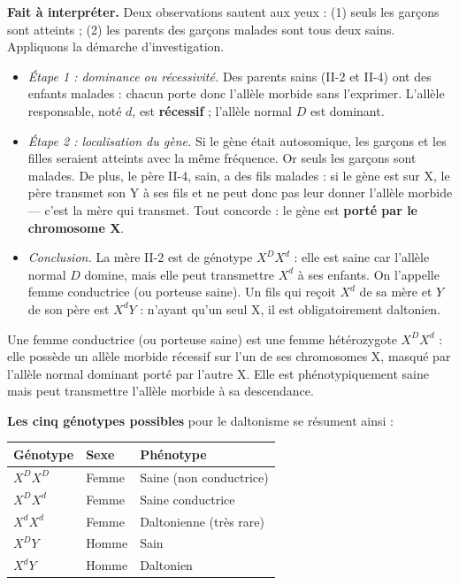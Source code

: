 \documentclass[11pt]{article}
\newcommand{\cle}[1]{{\popxbold\color{popdark}#1}}
\begin{document}
\textbf{Fait à interpréter.} Deux observations sautent aux yeux : (1) seuls les garçons sont atteints ; (2) les parents des garçons malades sont tous deux sains. Appliquons la démarche d'investigation.

\begin{itemize}
  \item \emph{Étape 1 : dominance ou récessivité.} Des parents sains (II-2 et II-4) ont des enfants malades : chacun porte donc l'allèle morbide sans l'exprimer. L'allèle responsable, noté $d$, est \textbf{récessif} ; l'allèle normal $D$ est dominant.
  \item \emph{Étape 2 : localisation du gène.} Si le gène était autosomique, les garçons et les filles seraient atteints avec la même fréquence. Or seuls les garçons sont malades. De plus, le père II-4, sain, a des fils malades : si le gène est sur X, le père transmet son Y à ses fils et ne peut donc pas leur donner l'allèle morbide — c'est la mère qui transmet. Tout concorde : le gène est \textbf{porté par le chromosome X}.
  \item \emph{Conclusion.} La mère II-2 est de génotype $X^{D}X^{d}$ : elle est saine car l'allèle normal $D$ domine, mais elle peut transmettre $X^{d}$ à ses enfants. On l'appelle \cle{femme conductrice} (ou porteuse saine). Un fils qui reçoit $X^{d}$ de sa mère et $Y$ de son père est $X^{d}Y$ : n'ayant qu'un seul X, il est obligatoirement daltonien.
\end{itemize}

\begin{definition}
Une \cle{femme conductrice} (ou porteuse saine) est une femme hétérozygote $X^{D}X^{d}$ : elle possède un allèle morbide récessif sur l'un de ses chromosomes X, masqué par l'allèle normal dominant porté par l'autre X. Elle est phénotypiquement saine mais peut transmettre l'allèle morbide à sa descendance.
\end{definition}

\textbf{Les cinq génotypes possibles} pour le daltonisme se résument ainsi :

\begin{center}
\begin{tabularx}{\linewidth}{|l|X|X|}
\hline
\rowcolor{popblueL} \textbf{Génotype} & \textbf{Sexe} & \textbf{Phénotype} \\
\hline
$X^{D}X^{D}$ & Femme & Saine (non conductrice) \\
\hline
$X^{D}X^{d}$ & Femme & Saine conductrice \\
\hline
$X^{d}X^{d}$ & Femme & Daltonienne (très rare) \\
\hline
$X^{D}Y$ & Homme & Sain \\
\hline
$X^{d}Y$ & Homme & Daltonien \\
\hline
\end{tabularx}
\end{center}
\end{document}
